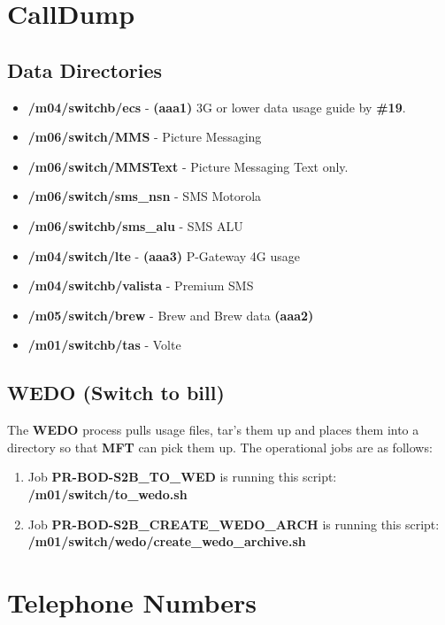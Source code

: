 \documentclass[12pt,twoside]{article}
\begin{document}
\section{CallDump}
\label{sec:orgheadline165}
\subsection{Data Directories}
\label{sec:orgheadline163}
\begin{itemize}
\item \textbf{/m04/switchb/ecs} - \textbf{(aaa1)} 3G or lower data usage guide by \textbf{\#19}.
\item \textbf{/m06/switch/MMS} - Picture Messaging
\item \textbf{/m06/switch/MMSText} - Picture Messaging Text only.
\item \textbf{/m06/switch/sms\_nsn} - SMS Motorola
\item \textbf{/m06/switchb/sms\_alu} - SMS ALU
\item \textbf{/m04/switch/lte} - \textbf{(aaa3)} P-Gateway 4G usage
\item \textbf{/m04/switchb/valista} - Premium SMS
\item \textbf{/m05/switch/brew} - Brew and Brew data \textbf{(aaa2)}
\item \textbf{/m01/switchb/tas} - Volte
\end{itemize}

\subsection{WEDO (Switch to bill)}
\label{sec:orgheadline164}
The \textbf{WEDO} process pulls usage files, tar's them up and places them
into a directory so that \textbf{MFT} can pick them up. The operational
jobs are as follows:

\begin{enumerate}
\item Job \textbf{PR-BOD-S2B\_TO\_WED} is running this script:
\textbf{/m01/switch/to\_wedo.sh}
\item Job \textbf{PR-BOD-S2B\_CREATE\_WEDO\_ARCH} is running this script:
\textbf{/m01/switch/wedo/create\_wedo\_archive.sh}
\end{enumerate}

\newpage
\section{Telephone Numbers}
\label{sec:orgheadline166}
\end{document}

